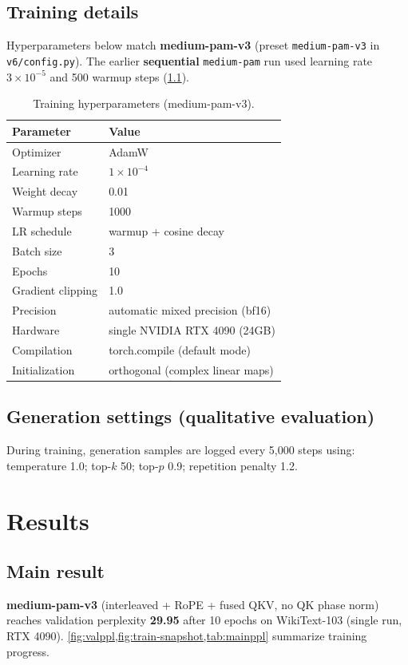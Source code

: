 \documentclass[11pt]{article}
\begin{document}
\subsection{Training details}
Hyperparameters below match \textbf{medium-pam-v3} (preset \texttt{medium-pam-v3} in \texttt{v6/config.py}). The earlier \textbf{sequential} \texttt{medium-pam} run used learning rate $3 \times 10^{-5}$ and 500 warmup steps (\cref{sec:main-result}).

\begin{table}[t]
  \centering
  \caption{Training hyperparameters (medium-pam-v3).}
  \label{tab:train}
  \begin{tabular}{@{}ll@{}}
    \toprule
    Parameter & Value \\
    \midrule
    Optimizer & AdamW \\
    Learning rate & $1 \times 10^{-4}$ \\
    Weight decay & 0.01 \\
    Warmup steps & 1000 \\
    LR schedule & warmup + cosine decay \\
    Batch size & 3 \\
    Epochs & 10 \\
    Gradient clipping & 1.0 \\
    Precision & automatic mixed precision (bf16) \\
    Hardware & single NVIDIA RTX 4090 (24GB) \\
    Compilation & torch.compile (default mode) \\
    Initialization & orthogonal (complex linear maps) \\
    \bottomrule
  \end{tabular}
\end{table}

\subsection{Generation settings (qualitative evaluation)}
During training, generation samples are logged every 5,000 steps using: temperature 1.0; top-$k$ 50; top-$p$ 0.9; repetition penalty 1.2.

\section{Results}
\label{sec:results}

\subsection{Main result}
\label{sec:main-result}
\textbf{medium-pam-v3} (interleaved + RoPE + fused QKV, no QK phase norm) reaches validation perplexity \textbf{29.95} after 10 epochs on WikiText-103 (single run, RTX 4090). \cref{fig:valppl,fig:train-snapshot,tab:mainppl} summarize training progress.
\end{document}
